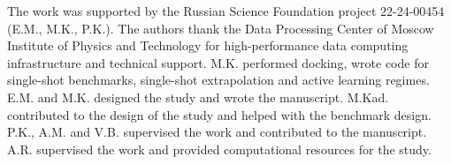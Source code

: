 \begin{acknowledgement}

The work was supported by the Russian Science Foundation project 22-24-00454 (E.M., M.K., P.K.). The authors thank the Data Processing Center of Moscow Institute of Physics and Technology for high-performance data computing infrastructure and technical support.
M.K. performed docking, wrote code for single-shot benchmarks, single-shot extrapolation and active learning regimes. E.M. and M.K. designed the study and wrote the manuscript. M.Kad. contributed to the design of the study and helped with the benchmark design.
P.K., A.M. and V.B. supervised the work and contributed to the manuscript.
A.R. supervised the work and provided computational resources for the study.

\end{acknowledgement}